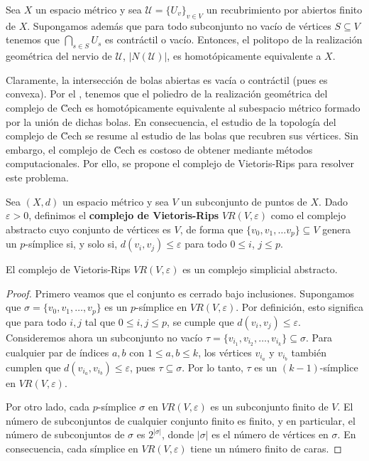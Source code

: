 \begin{teorema}
	 \label{teo:nerve} Sea $X$ un espacio métrico y sea $\mathcal{U}
	= \{U_{v}\}_{v \in V}$ un recubrimiento por abiertos finito de $X$. Supongamos
	además que para todo subconjunto no vacío de vértices $S \subseteq V$ tenemos
	que $\bigcap_{s \in S}U_{s}$ es contráctil o vacío. Entonces, el politopo de
	la realización geométrica del nervio de $\mathcal{U}$, $|N(\mathcal{U})|$, es
	homotópicamente equivalente a $X$.
\end{teorema}

Claramente, la intersección de bolas abiertas es vacía o contráctil (pues es convexa).
Por el , tenemos que el poliedro de la realización geométrica
del complejo de \u Cech es homotópicamente equivalente al subespacio métrico formado
por la unión de dichas bolas. En consecuencia, el estudio de la topología del complejo
de \u Cech se resume al estudio de las bolas que recubren sus vértices. Sin
embargo, el complejo de \u Cech es costoso de obtener mediante métodos computacionales.
Por ello, se propone el complejo de Vietoris-Rips para resolver este problema.

\begin{definicion}
	Sea $(X,d)$ un espacio métrico y sea $V$ un subconjunto de puntos de $X$. Dado
	$\varepsilon > 0$, definimos el \textbf{complejo de Vietoris-Rips}
	$VR(V,\varepsilon)$ como el complejo abstracto cuyo conjunto de vértices es
	$V$, de forma que $\{v_{0}, v_{1}, \dots v_{p}\} \subseteq V$ genera un $p$-símplice
	si, y solo si, $d(v_{i},v_{j}) \leq \varepsilon$ para todo $0 \leq i$,
	$j \leq p$.
\end{definicion}

\begin{proposicion}
	El complejo de Vietoris-Rips $VR(V,\varepsilon)$ es un complejo simplicial abstracto.
\end{proposicion}

\begin{proof}
	Primero veamos que el conjunto es cerrado bajo inclusiones. Supongamos que
	$\sigma = \{v_{0}, v_{1}, \dots, v_{p}\}$ es un $p$-símplice en
	$VR(V, \varepsilon)$. Por definición, esto significa que para todo $i, j$ tal
	que $0 \leq i, j \leq p$, se cumple que $d(v_{i}, v_{j}) \leq \varepsilon$.
	Consideremos ahora un subconjunto no vacío
	$\tau = \{v_{i_1}, v_{i_2}, \dots, v_{i_k}\} \subseteq \sigma$. Para cualquier
	par de índices $a, b$ con $1 \leq a, b \leq k$, los vértices $v_{i_a}$ y
	$v_{i_b}$ también cumplen que $d(v_{i_a}, v_{i_b}) \leq \varepsilon$, pues $\tau
	\subseteq \sigma$. Por lo tanto, $\tau$ es un $(k-1)$-símplice en $VR(V, \varepsilon
	)$.
	
	Por otro lado, cada $p$-símplice $\sigma$ en $VR(V, \varepsilon)$ es un
	subconjunto finito de $V$. El número de subconjuntos de cualquier conjunto finito
	es finito, y en particular, el número de subconjuntos de $\sigma$ es $2^{|\sigma|}$,
	donde $|\sigma|$ es el número de vértices en $\sigma$. En consecuencia, cada
	símplice en $VR(V, \varepsilon)$ tiene un número finito de caras.
\end{proof}

